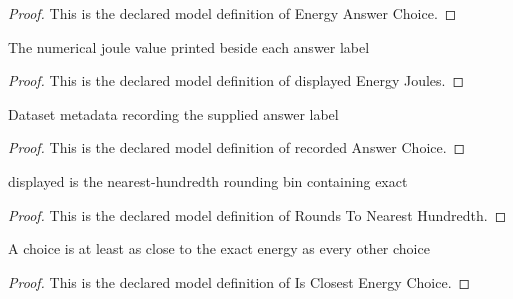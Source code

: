 \begin{proof}
  This is the declared model definition of Energy Answer Choice.
\end{proof}
\begin{definition}
  \label{def:physics:phyx-mini-0819:phyxminiproblems-problemphyxmini0819-displayedenergyjoules}
  The numerical joule value printed beside each answer label
\end{definition}
\begin{proof}
  This is the declared model definition of displayed Energy Joules.
\end{proof}
\begin{definition}
  \label{def:physics:phyx-mini-0819:phyxminiproblems-problemphyxmini0819-recordedanswerchoice}
  Dataset metadata recording the supplied answer label
\end{definition}
\begin{proof}
  This is the declared model definition of recorded Answer Choice.
\end{proof}
\begin{definition}
  \label{def:physics:phyx-mini-0819:phyxminiproblems-problemphyxmini0819-roundstonearesthundredth}
  displayed is the nearest-hundredth rounding bin containing exact
\end{definition}
\begin{proof}
  This is the declared model definition of Rounds To Nearest Hundredth.
\end{proof}
\begin{definition}
  \label{def:physics:phyx-mini-0819:phyxminiproblems-problemphyxmini0819-isclosestenergychoice}
  A choice is at least as close to the exact energy as every other choice
\end{definition}
\begin{proof}
  This is the declared model definition of Is Closest Energy Choice.
\end{proof}
